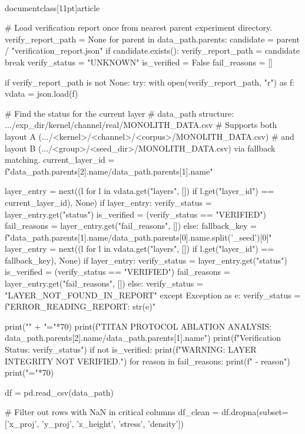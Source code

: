 \\documentclass[11pt]{article}
\begin{document}
\begin{CodeBlock}
    # Load verification report once from nearest parent experiment directory.
    verify_report_path = None
    for parent in data_path.parents:
        candidate = parent / "verification_report.json"
        if candidate.exists():
            verify_report_path = candidate
            break
    verify_status = "UNKNOWN"
    is_verified = False
    fail_reasons = []
    
    if verify_report_path is not None:
        try:
            with open(verify_report_path, "r") as f:
                vdata = json.load(f)
            
            # Find the status for the current layer
            # data_path structure: .../exp_dir/kernel/channel/real/MONOLITH_DATA.csv
            # Supports both layout A (.../<kernel>/<channel>/<corpus>/MONOLITH_DATA.csv)
            # and layout B (.../<group>/<seed_dir>/MONOLITH_DATA.csv) via fallback matching.
            current_layer_id = f"{data_path.parents[2].name}/{data_path.parents[1].name}"
            
            layer_entry = next((l for l in vdata.get("layers", []) if l.get("layer_id") == current_layer_id), None)
            if layer_entry:
                verify_status = layer_entry.get("status")
                is_verified = (verify_status == "VERIFIED")
                fail_reasons = layer_entry.get("fail_reasons", [])
            else:
                fallback_key = f"{data_path.parents[1].name}/{data_path.parents[0].name.split('_seed')[0]}"
                layer_entry = next((l for l in vdata.get("layers", []) if l.get("layer_id") == fallback_key), None)
                if layer_entry:
                    verify_status = layer_entry.get("status")
                    is_verified = (verify_status == "VERIFIED")
                    fail_reasons = layer_entry.get("fail_reasons", [])
                else:
                    verify_status = "LAYER_NOT_FOUND_IN_REPORT"
        except Exception as e:
            verify_status = f"ERROR_READING_REPORT: {str(e)}"

    print("\n" + "="*70)
    print(f"TITAN PROTOCOL ABLATION ANALYSIS: {data_path.parents[2].name}/{data_path.parents[1].name}")
    print(f"Verification Status: {verify_status}")
    if not is_verified:
        print(f"WARNING: LAYER INTEGRITY NOT VERIFIED.")
        for reason in fail_reasons:
            print(f"  - {reason}")
    print("="*70)

    df = pd.read_csv(data_path)

    # Filter out rows with NaN in critical columns
    df_clean = df.dropna(subset=['x_proj', 'y_proj', 'z_height', 'stress', 'density'])


\end{CodeBlock}
\end{document}
